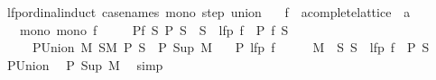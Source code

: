 \begin{isabellebody}
\endisatagproof
{\isafoldproof}%
%
\isadelimproof
%
\endisadelimproof
%
\isadelimdocument
%
\endisadelimdocument
%
\isatagdocument
%
\isamarkuptrue%
%
\endisatagdocument
{\isafolddocument}%
%
\isadelimdocument
%
\endisadelimdocument
{}\isamarkupfalse%
\ lfp{\isacharunderscore}{\kern0pt}ordinal{\isacharunderscore}{\kern0pt}induct\ {\isacharbrackleft}{\kern0pt}case{\isacharunderscore}{\kern0pt}names\ mono\ step\ union{\isacharbrackright}{\kern0pt}{\isacharcolon}{\kern0pt}\isanewline
\ \ \ f\ {\isacharcolon}{\kern0pt}{\isacharcolon}{\kern0pt}\ {\isachardoublequoteopen}{\isacharprime}{\kern0pt}a{\isacharcolon}{\kern0pt}{\isacharcolon}{\kern0pt}complete{\isacharunderscore}{\kern0pt}lattice\ {\isasymRightarrow}\ {\isacharprime}{\kern0pt}a{\isachardoublequoteclose}\isanewline
\ \ \ mono{\isacharcolon}{\kern0pt}\ {\isachardoublequoteopen}mono\ f{\isachardoublequoteclose}\isanewline
\ \ \ \ \ P{\isacharunderscore}{\kern0pt}f{\isacharcolon}{\kern0pt}\ {\isachardoublequoteopen}{\isasymAnd}S{\isachardot}{\kern0pt}\ P\ S\ {\isasymLongrightarrow}\ S\ {\isasymle}\ lfp\ f\ {\isasymLongrightarrow}\ P\ {\isacharparenleft}{\kern0pt}f\ S{\isacharparenright}{\kern0pt}{\isachardoublequoteclose}\isanewline
\ \ \ \ \ P{\isacharunderscore}{\kern0pt}Union{\isacharcolon}{\kern0pt}\ {\isachardoublequoteopen}{\isasymAnd}M{\isachardot}{\kern0pt}\ {\isasymforall}S{\isasymin}M{\isachardot}{\kern0pt}\ P\ S\ {\isasymLongrightarrow}\ P\ {\isacharparenleft}{\kern0pt}Sup\ M{\isacharparenright}{\kern0pt}{\isachardoublequoteclose}\isanewline
\ \ \ {\isachardoublequoteopen}P\ {\isacharparenleft}{\kern0pt}lfp\ f{\isacharparenright}{\kern0pt}{\isachardoublequoteclose}\isanewline
%
\isadelimproof
%
\endisadelimproof
%
\isatagproof
{}\isamarkupfalse%
\ {\isacharminus}{\kern0pt}\isanewline
\ \ \isamarkupfalse%
\ {\isacharquery}{\kern0pt}M\ {\isacharequal}{\kern0pt}\ {\isachardoublequoteopen}{\isacharbraceleft}{\kern0pt}S{\isachardot}{\kern0pt}\ S\ {\isasymle}\ lfp\ f\ {\isasymand}\ P\ S{\isacharbraceright}{\kern0pt}{\isachardoublequoteclose}\isanewline
\ \ \isamarkupfalse%
\ P{\isacharunderscore}{\kern0pt}Union\ \isamarkupfalse%
\ {\isachardoublequoteopen}P\ {\isacharparenleft}{\kern0pt}Sup\ {\isacharquery}{\kern0pt}M{\isacharparenright}{\kern0pt}{\isachardoublequoteclose}\ \isamarkupfalse%
\ simp\isanewline
\ \ \isamarkupfalse%
\ \isamarkupfalse%

\end{isabellebody}
